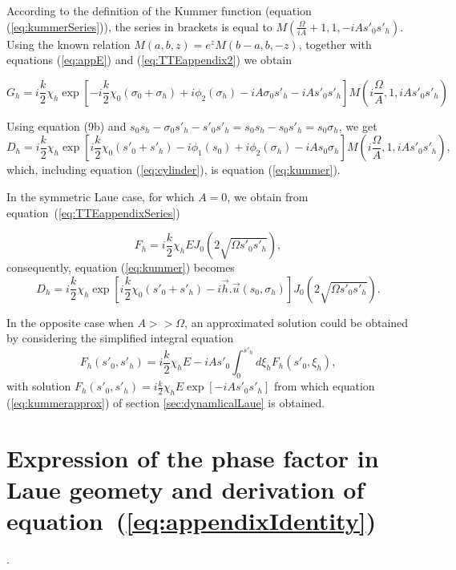 \documentclass[preprint]{iucr}              %
\begin{document}
According to the definition of the Kummer function (equation (\ref{eq:kummerSeries})), the series in brackets is equal to $M(\frac{\Omega}{iA}+1, 1, -iA s'_0 s'_h)$. Using the known relation
$M(a,b,z)=e^z M(b-a,b,-z)$, together with equations (\ref{eq:appE}) and (\ref{eq:TTEappendix2}) we obtain

\begin{equation}
    G_h = i\frac{k}{2}\chi_h \exp\left[-i \frac{k}{2} \chi_0 (\sigma_0+\sigma_h)+ i \phi_2(\sigma_h)-i A \sigma_0 s'_h - i A s'_0 s'_h\right] M(i\frac{\Omega}{A},1,i A s'_0 s'_h)
\end{equation}

Using equation (9b) and $s_0s_h-\sigma_0 s'_h - s'_0 s'_h=s_0 s_h - s_0 s'_h = s_0 \sigma_h$, we get
\begin{equation}
    D_h = i \frac{k}{2} \chi_h \exp\left[  i \frac{k}{2} \chi_0 (s'_0+s'_h) - i\phi_1(s_0) + i \phi_2(\sigma_h) - iA s_0 \sigma_h \right] M(i\frac{\Omega}{A},1,i A s'_0 s'_h), 
\end{equation}
which, including equation (\ref{eq:cylinder}), is equation (\ref{eq:kummer}).

In the symmetric Laue case, for which $A=0$, we obtain from equation~(\ref{eq:TTEappendixSeries})

\begin{equation}
    F_h = i \frac{k}{2} \chi_h E J_0(2 \sqrt{\Omega s'_0 s'_h}),
\end{equation}
consequently, equation (\ref{eq:kummer}) becomes
\begin{equation}
    D_h = i \frac{k}{2} \chi_h \exp\left[  i \frac{k}{2} \chi_0 (s'_0+s'_h) - i \vec h . \vec u(s_0,\sigma_h) \right] J_0(2\sqrt{\Omega s'_0 s'_h}).
\end{equation}


In the opposite case when $A >> \Omega$, an approximated solution could be obtained by considering the simplified integral equation
\begin{equation}
        F_h(s'_0,s'_h) = i\frac{k}{2}\chi_h E - i A s'_0 \int_0^{s'_h} d\xi_h F_h(s'_0,\xi_h),
\end{equation}
with solution $F_h(s'_0,s'_h) = i\frac{k}{2}\chi_h E \exp[-i A s'_0 s'_h]$ from which equation (\ref{eq:kummerapprox}) of section \ref{sec:dynamlicalLaue} is obtained.


\section{Expression of the phase factor in Laue geomety and derivation of equation~(\ref{eq:appendixIdentity})}
\label{appendix:Deformation}.
\end{document}
